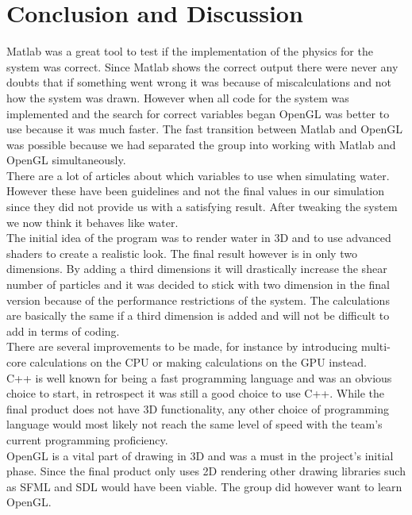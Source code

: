 \documentclass[a4paper,12pt,twoside,final]{report}
\begin{document}
\chapter{Conclusion and Discussion}

Matlab was a great tool to test if the implementation of the physics for the system was correct. Since Matlab shows the correct output there were never any doubts that if something went wrong it was because of miscalculations and not how the system was drawn. However when all code for the system was implemented and the search for correct variables began OpenGL was better to use because it was much faster. The fast transition between Matlab and OpenGL was possible because we had separated the group into working with Matlab and OpenGL simultaneously. \\

\noindent There are a lot of articles about which variables to use when simulating water. However these have been guidelines and not the final values in our simulation since they did not provide us with a satisfying result. After tweaking the system we now think it behaves like water. \\

\noindent The initial idea of the program was to render water in 3D and to use advanced shaders to create a realistic look. The final result however is in only two dimensions. By adding a third dimensions it will drastically increase the shear number of particles and it was decided to stick with two dimension in the final version because of the performance restrictions of the system. The calculations are basically the same if a third dimension is added and will not be difficult to add in terms of coding. \\

\noindent There are several improvements to be made, for instance by introducing multi-core calculations on the CPU or making calculations on the GPU instead. \\

\noindent C++ is well known for being a fast programming language and was an obvious choice to start, in retrospect it was still a good choice to use C++. While the final product does not have 3D functionality, any other choice of programming language would most likely not reach the same level of speed with the team’s current programming proficiency. \\

\noindent OpenGL is a vital part of drawing in 3D and was a must in the project’s initial phase. Since the final product only uses 2D rendering other drawing libraries such as SFML and SDL would have been viable. The group did however want to learn OpenGL.
\end{document}
